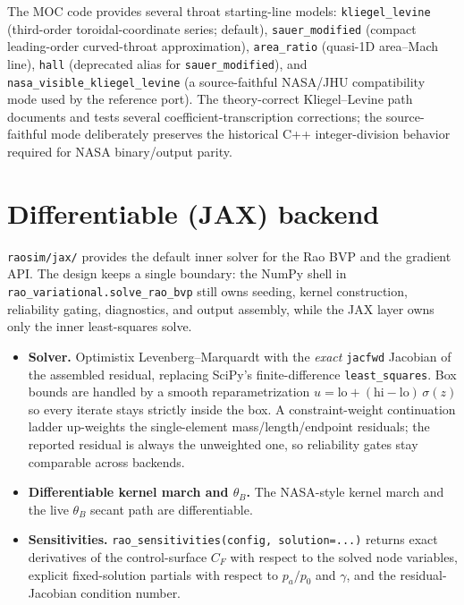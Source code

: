 \documentclass[11pt]{article}
\newcommand{\code}[1]{\texttt{#1}}
\begin{document}
The MOC code provides several throat starting-line models: \code{kliegel\_levine}
(third-order toroidal-coordinate series; default), \code{sauer\_modified}
(compact leading-order curved-throat approximation), \code{area\_ratio}
(quasi-1D area--Mach line), \code{hall} (deprecated alias for
\code{sauer\_modified}), and \code{nasa\_visible\_kliegel\_levine} (a
source-faithful NASA/JHU compatibility mode used by the reference port). The
theory-correct Kliegel--Levine path documents and tests several
coefficient-transcription corrections; the source-faithful mode deliberately
preserves the historical C++ integer-division behavior required for NASA
binary/output parity.

\section{Differentiable (JAX) backend}

\code{raosim/jax/} provides the default inner solver for the Rao BVP and the
gradient API. The design keeps a single boundary: the NumPy shell in
\code{rao\_variational.solve\_rao\_bvp} still owns seeding, kernel
construction, reliability gating, diagnostics, and output assembly, while the
JAX layer owns only the inner least-squares solve.

\begin{itemize}
\item \textbf{Solver.} Optimistix Levenberg--Marquardt with the \emph{exact}
\code{jacfwd} Jacobian of the assembled residual, replacing SciPy's
finite-difference \code{least\_squares}. Box bounds are handled by a smooth
reparametrization $u = \mathrm{lo} + (\mathrm{hi}-\mathrm{lo})\,\sigma(z)$ so
every iterate stays strictly inside the box. A constraint-weight continuation
ladder up-weights the single-element mass/length/endpoint residuals; the
reported residual is always the unweighted one, so reliability gates stay
comparable across backends.
\item \textbf{Differentiable kernel march and $\theta_B$.} The NASA-style
kernel march and the live $\theta_B$ secant path are differentiable.
\item \textbf{Sensitivities.} \code{rao\_sensitivities(config, solution=...)}
returns exact derivatives of the control-surface $C_F$ with respect to the
solved node variables, explicit fixed-solution partials with respect to
$p_a/p_0$ and $\gamma$, and the residual-Jacobian condition number.
\end{itemize}
\end{document}
